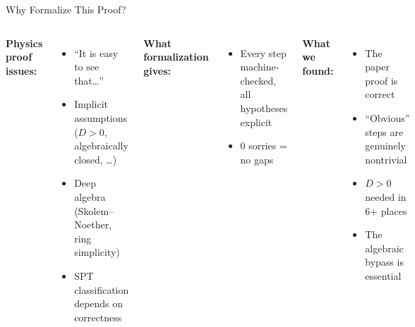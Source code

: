 \documentclass[aspectratio=169,10pt]{beamer}
\begin{document}
\begin{frame}{Why Formalize This Proof?}
\vspace{-0.3em}
\begin{columns}[T]
{\small\textbf{\textcolor{softred}{Physics proof issues:}}}
\begin{itemize}\itemsep0.1em
\item {\small ``It is easy to see that\dots''}
\item {\small Implicit assumptions ($D>0$, algebraically closed, \dots)}
\item {\small Deep algebra (Skolem--Noether, ring simplicity)}
\item {\small SPT classification depends on correctness}
\end{itemize}

{\small\textbf{\textcolor{leangreen}{What formalization gives:}}}
\begin{itemize}\itemsep0.1em
\item {\small Every step machine-checked, all hypotheses explicit}
\item {\small 0 sorries = no gaps}
\end{itemize}

\vspace{0.3em}
{\small\textbf{What we found:}}
\begin{itemize}\itemsep0.1em
\item {\small The paper proof is correct}
\item {\small ``Obvious'' steps are genuinely nontrivial}
\item {\small $D>0$ needed in 6+ places}
\item {\small The algebraic bypass is essential}
\end{itemize}
\end{columns}
\end{frame}
\end{document}
